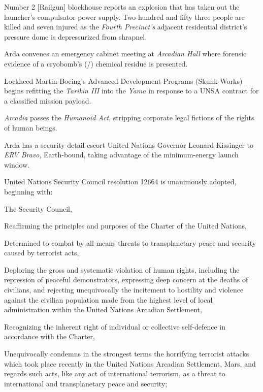 Number 2 [Railgun] blockhouse reports an explosion that has taken out the launcher's compulsator power supply. Two-hundred and fifty three people are killed and seven injured as the {\it Fourth Precinct's} adjacent residential district's pressure dome is depressurized from shrapnel.

Arda convenes an emergency cabinet meeting at {\it Arcadian Hall} where forensic evidence of a cryobomb's (/) chemical residue is presented.
\StopTimelineDate

Lockheed Martin-Boeing's Advanced Development Programs (Skunk Works) begins refitting the {\it Tarikin III} into the {\it Yama} in response to a UNSA contract for a classified mission payload.
\StopTimelineDate

{\it Arcadia} passes the {\it Humanoid Act}, stripping corporate legal fictions of the rights of human beings.
\StopTimelineDate

Arda has a security detail escort United Nations Governor Leonard Kissinger to {\it ERV Bravo}, Earth-bound, taking advantage of the minimum-energy launch window.
\StopTimelineDate

United Nations Security Council resolution 12664 is unanimously adopted, beginning with:

\startTimelineDocument
The Security Council,

Reaffirming the principles and purposes of the Charter of the United Nations,

Determined to combat by all means threats to transplanetary peace and security caused by terrorist acts,

Deploring the gross and systematic violation of human rights, including the repression of peaceful demonstrators, expressing deep concern at the deaths of civilians, and rejecting unequivocally the incitement to hostility and violence against the civilian population made from the highest level of local administration within the United Nations Arcadian Settlement,

Recognizing the inherent right of individual or collective self-defence in accordance with the Charter,

\startitemize[n]
\setupwhitespace[big]
\item Unequivocally condemns in the strongest terms the horrifying terrorist attacks which took place recently in the United Nations Arcadian Settlement, Mars, and regards such acts, like any act of international terrorism, as a threat to international and transplanetary peace and security;

